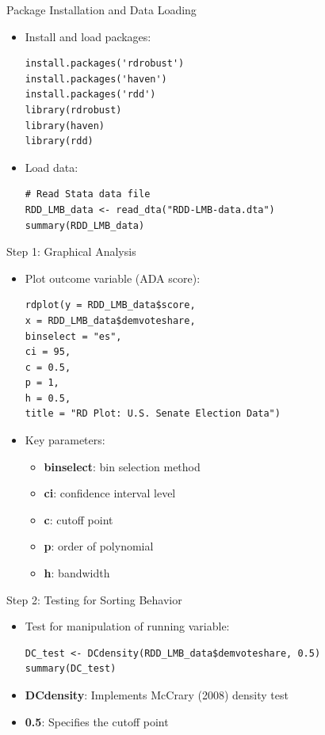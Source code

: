 \documentclass[dvipsnames,hyperref={pdfpagelabels=false}]{beamer}
\begin{document}
\begin{frame}[fragile]{Package Installation and Data Loading}
	\begin{itemize}
		\item Install and load packages:
\begin{lstlisting}
install.packages('rdrobust')
install.packages('haven')
install.packages('rdd')
library(rdrobust)
library(haven)
library(rdd)
\end{lstlisting}
		
		\item Load data:
\begin{lstlisting}
# Read Stata data file
RDD_LMB_data <- read_dta("RDD-LMB-data.dta")
summary(RDD_LMB_data)
\end{lstlisting}
	\end{itemize}
\end{frame}

\begin{frame}[fragile]{Step 1: Graphical Analysis}
	\begin{itemize}
		\item Plot outcome variable (ADA score):
\begin{lstlisting}
rdplot(y = RDD_LMB_data$score, 
x = RDD_LMB_data$demvoteshare, 
binselect = "es",
ci = 95, 
c = 0.5,
p = 1,
h = 0.5, 
title = "RD Plot: U.S. Senate Election Data")
\end{lstlisting}
		
		\item Key parameters:
		\begin{itemize}
			\item \textbf{binselect}: bin selection method
			\item \textbf{ci}: confidence interval level
			\item \textbf{c}: cutoff point
			\item \textbf{p}: order of polynomial
			\item \textbf{h}: bandwidth
		\end{itemize}
	\end{itemize}
\end{frame}

\begin{frame}[fragile]{Step 2: Testing for Sorting Behavior}
	\begin{itemize}
		\item Test for manipulation of running variable:
\begin{lstlisting}
DC_test <- DCdensity(RDD_LMB_data$demvoteshare, 0.5)
summary(DC_test)
\end{lstlisting}
		
		\item \textbf{DCdensity}: Implements McCrary (2008) density test
		\item \textbf{0.5}: Specifies the cutoff point
	\end{itemize}
\end{frame}
\end{document}
